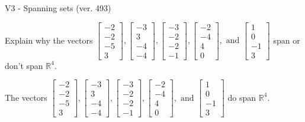 \begin{exercise}
  \begin{exerciseTitle}V3 - Spanning sets (ver. 493)\end{exerciseTitle}
  \begin{exerciseStatement}
    Explain why the vectors \(\left[\begin{array}{r}
-2 \\
-2 \\
-5 \\
3
\end{array}\right] , \left[\begin{array}{r}
-3 \\
3 \\
-4 \\
-4
\end{array}\right] , \left[\begin{array}{r}
-3 \\
-2 \\
-2 \\
-1
\end{array}\right] , \left[\begin{array}{r}
-2 \\
-4 \\
4 \\
0
\end{array}\right] , \text{ and } \left[\begin{array}{r}
1 \\
0 \\
-1 \\
3
\end{array}\right]\) span or don't span \(\mathbb{R}^4\). 
	


  \end{exerciseStatement}
  \begin{exerciseAnswer}
   The vectors \(\left[\begin{array}{r}
-2 \\
-2 \\
-5 \\
3
\end{array}\right] , \left[\begin{array}{r}
-3 \\
3 \\
-4 \\
-4
\end{array}\right] , \left[\begin{array}{r}
-3 \\
-2 \\
-2 \\
-1
\end{array}\right] , \left[\begin{array}{r}
-2 \\
-4 \\
4 \\
0
\end{array}\right] , \text{ and } \left[\begin{array}{r}
1 \\
0 \\
-1 \\
3
\end{array}\right]\) 
  	 do  
	span \(\mathbb{R}^4\).
  



\end{exerciseAnswer}
\end{exercise}
